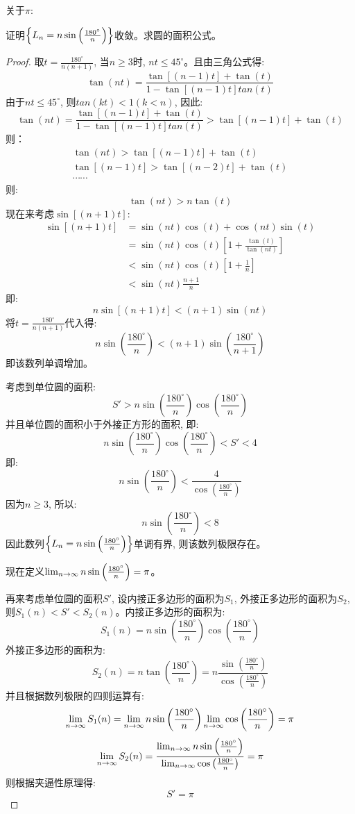 \documentclass[lang=cn]{elegantbook}
\begin{document}
关于$\pi$:
\begin{proposition}
    证明$\left\{ L_n = n\sin \left ( \frac{180^\circ}{n} \right )\right\}$收敛。求圆的面积公式。
\end{proposition}
\begin{proof}
取$t = \frac{180^\circ}{n(n+1)}$, 当$n \ge 3$时, $nt \le 45^\circ$。且由三角公式得: 
\[ \tan (nt) = \frac{\tan[(n-1)t] + \tan(t)}{1 - \tan[(n-1)t]tan(t)} \]
由于$nt \le 45^\circ$, 则$tan(kt) < 1(k < n)$, 因此: 
\[ \tan (nt) = \frac{\tan[(n-1)t] + \tan(t)}{1 - \tan[(n-1)t]tan(t)} > \tan[(n-1)t] + \tan(t)\]
则：
\begin{gather*}
    \tan(nt) > \tan[(n-1)t] + \tan(t) \\ 
    \tan[(n-1)t] > \tan[(n-2)t] + \tan(t) \\
    \cdots \cdots
\end{gather*}
则: 
\[ \tan(nt) > n\tan(t)\]
现在来考虑$\sin[(n+1)t]$: 
\[
\begin{split}
    \sin[(n+1)t] &= \sin(nt)\cos(t) + \cos(nt)\sin(t) \\
                &= \sin(nt)\cos(t)\left[ 1 + \frac{\tan(t)}{\tan(nt)}\right] \\
                &< \sin(nt)\cos(t)\left[ 1 + \frac{1}{n} \right] \\
                & < \sin(nt)\frac{n+1}{n}
\end{split}
\]
即: 
\[ n\sin[(n+1)t] < (n+1)\sin(nt) \]
将$t = \frac{180^\circ}{n(n+1)}$代入得: 
\[ n\sin\left( \frac{180^\circ}{n}\right) < (n + 1)\sin\left( \frac{180^\circ}{n+1} \right)\]
即该数列单调增加。

考虑到单位圆的面积: 
\[ S' > n \sin\left( \frac{180^\circ}{n}\right) \cos\left( \frac{180^\circ}{n}\right) \]
并且单位圆的面积小于外接正方形的面积, 即: 
\[ n \sin\left( \frac{180^\circ}{n}\right) \cos\left( \frac{180^\circ}{n}\right) < S' < 4 \]
即: 
\[ n\sin\left( \frac{180^\circ}{n}\right) < \frac{4}{\cos\left( \frac{180^\circ}{n}\right)}\]
因为$n \ge 3$, 所以: 
\[ n\sin\left( \frac{180^\circ}{n}\right) < 8\]
因此数列$\left\{ L_n = n\sin \left ( \frac{180^\circ}{n} \right )\right\}$单调有界, 则该数列极限存在。

现在定义$\lim_{n \to \infty } n\sin \left ( \frac{180^\circ}{n} \right ) = \pi$。

再来考虑单位圆的面积$S'$, 设内接正多边形的面积为$S_1$, 外接正多边形的面积为$S_2$, 则$S_1(n) < S' < S_2(n)$。内接正多边形的面积为:
\[ S_1(n) = n \sin\left( \frac{180^\circ}{n}\right) \cos\left( \frac{180^\circ}{n}\right)\]
外接正多边形的面积为: 
\[ S_2(n) = n \tan\left( \frac{180^\circ}{n}\right)  = n \frac{\sin\left( \frac{180^\circ}{n}\right)}{\cos\left( \frac{180^\circ}{n}\right)} \]
并且根据数列极限的四则运算有:
\[ \lim_{n \to \infty } S_1(n) = \lim_{n \to \infty } n \sin\left( \frac{180^\circ}{n}\right) \lim_{n \to \infty } \cos\left( \frac{180^\circ}{n}\right) = \pi\]
\[ \lim_{n \to \infty } S_2(n) = \frac{\lim_{n \to \infty } n\sin\left( \frac{180^\circ}{n}\right)}{\lim_{n \to \infty } \cos\left( \frac{180^\circ}{n}\right)} = \pi\]
则根据夹逼性原理得:
\[ S' = \pi \]


\end{proof}
\end{document}
